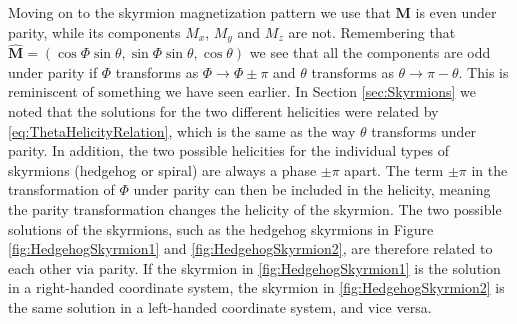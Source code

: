 Moving on to the skyrmion magnetization pattern we use that $\mathbold{M}$ is even under parity, while its components $M_x$, $M_y$ and $M_z$ are not. Remembering that $\mathbold{\hat{M}} = \left(\cos\Phi\sin\theta, \sin\Phi\sin\theta, \cos\theta\right)$ we see that all the components are odd under parity if $\Phi$ transforms as $\Phi \rightarrow \Phi \pm \pi$ and $\theta$ transforms as $\theta\rightarrow\pi-\theta$. This is reminiscent of something we have seen earlier. In Section \ref{sec:Skyrmions} we noted that the solutions for the two different helicities were related by \eqref{eq:ThetaHelicityRelation}, which is the same as the way $\theta$ transforms under parity. In addition, the two possible helicities for the individual types of skyrmions (hedgehog or spiral) are always a phase $\pm\pi$ apart. The term $\pm\pi$ in the transformation of $\Phi$ under parity can then be included in the helicity, meaning the parity transformation changes the helicity of the skyrmion. The two possible solutions of the skyrmions, such as the hedgehog skyrmions in Figure \ref{fig:HedgehogSkyrmion1} and \ref{fig:HedgehogSkyrmion2}, are therefore related to each other via parity. If the skyrmion in \ref{fig:HedgehogSkyrmion1} is the solution in a right-handed coordinate system, the skyrmion in \ref{fig:HedgehogSkyrmion2} is the same solution in a left-handed coordinate system, and vice versa.
